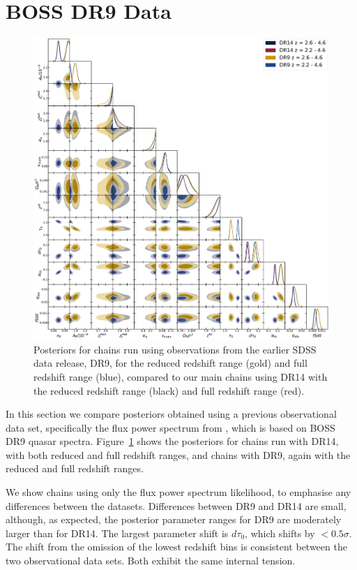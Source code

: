 \section{BOSS DR9 Data}\label{sec:dr9_results}
\begin{figure}
    \centering
    \includegraphics[width=\textwidth]{figures/dr9_allp_corner.pdf}
    \caption{\label{fig:dr9_corner}
    Posteriors for chains run using observations from the earlier SDSS data release, DR9, for the reduced redshift range (gold) and full redshift range (blue), compared to our main chains using DR14 with the reduced redshift range (black) and full redshift range (red).
    }
\end{figure}

In this section we compare posteriors obtained using a previous observational data set, specifically the flux power spectrum from \cite{2013A&A...559A..85P}, which is based on BOSS DR9 quasar spectra.
Figure~\ref{fig:dr9_corner} shows the posteriors for chains run with DR14, with both reduced and full redshift ranges, and chains with DR9, again with the reduced and full redshift ranges.

We show chains using only the flux power spectrum likelihood, to emphasise any differences between the datasets.
Differences between DR9 and DR14 are small, although, as expected, the posterior parameter ranges for DR9 are moderately larger than for DR14.
The largest parameter shift is $d\tau_0$, which shifts by $< 0.5 \sigma$. The shift from the omission of the lowest redshift bins is consistent between the two observational data sets.
Both exhibit the same internal tension.

